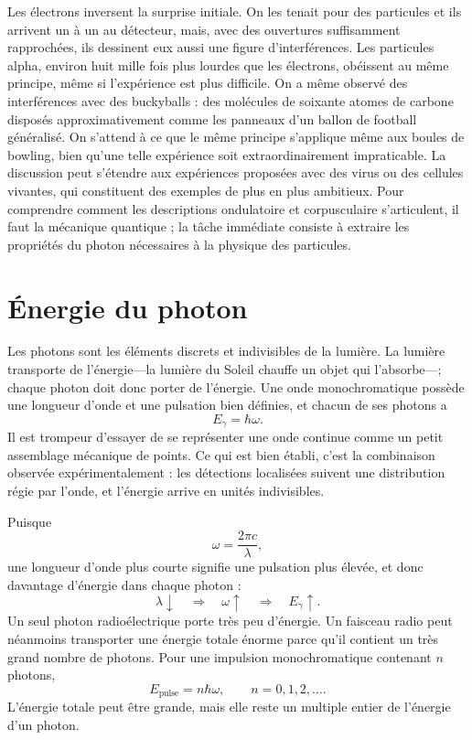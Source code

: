 Les électrons inversent la surprise initiale. On les tenait pour des particules et ils arrivent un à un au détecteur, mais, avec des ouvertures suffisamment rapprochées, ils dessinent eux aussi une figure d’interférences. Les particules alpha, environ huit mille fois plus lourdes que les électrons, obéissent au même principe, même si l’expérience est plus difficile. On a même observé des interférences avec des buckyballs : des molécules de soixante atomes de carbone disposés approximativement comme les panneaux d’un ballon de football généralisé. On s’attend à ce que le même principe s’applique même aux boules de bowling, bien qu’une telle expérience soit extraordinairement impraticable. La discussion peut s’étendre aux expériences proposées avec des virus ou des cellules vivantes, qui constituent des exemples de plus en plus ambitieux. Pour comprendre comment les descriptions ondulatoire et corpusculaire s’articulent, il faut la mécanique quantique ; la tâche immédiate consiste à extraire les propriétés du photon nécessaires à la physique des particules.

\section{Énergie du photon}

Les photons sont les éléments discrets et indivisibles de la lumière. La lumière transporte de l’énergie---la lumière du Soleil chauffe un objet qui l’absorbe---; chaque photon doit donc porter de l’énergie. Une onde monochromatique possède une longueur d’onde et une pulsation bien définies, et chacun de ses photons a
\begin{equation}
E_\gamma=\hbar\omega.
\end{equation}
Il est trompeur d’essayer de se représenter une onde continue comme un petit assemblage mécanique de points. Ce qui est bien établi, c’est la combinaison observée expérimentalement : les détections localisées suivent une distribution régie par l’onde, et l’énergie arrive en unités indivisibles.

Puisque
\begin{equation}
\omega=\frac{2\pi c}{\lambda},
\end{equation}
une longueur d’onde plus courte signifie une pulsation plus élevée, et donc davantage d’énergie dans chaque photon :
\begin{equation}
\lambda\downarrow
\quad\Longrightarrow\quad
\omega\uparrow
\quad\Longrightarrow\quad
E_\gamma\uparrow.
\end{equation}
Un seul photon radioélectrique porte très peu d’énergie. Un faisceau radio peut néanmoins transporter une énergie totale énorme parce qu’il contient un très grand nombre de photons. Pour une impulsion monochromatique contenant \(n\) photons,
\begin{equation}
E_{\text{pulse}}=n\hbar\omega,
\qquad
n=0,1,2,\ldots.
\end{equation}
L’énergie totale peut être grande, mais elle reste un multiple entier de l’énergie d’un photon.

